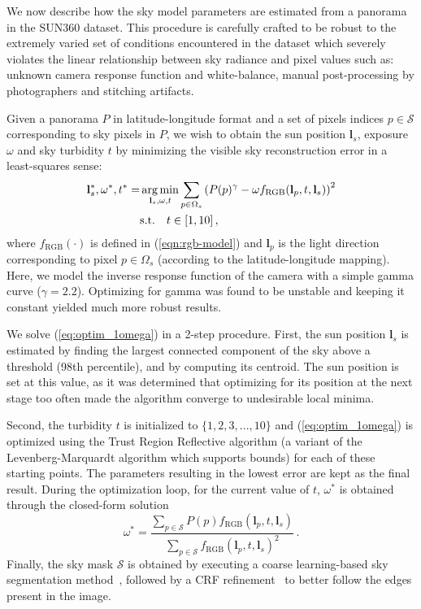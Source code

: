 We now describe how the sky model parameters are estimated from a panorama in the SUN360 dataset. This procedure is carefully crafted to be robust to the extremely varied set of conditions encountered in the dataset which severely violates the linear relationship between sky radiance and pixel values such as: unknown camera response function and white-balance, manual post-processing by photographers and stitching artifacts. 

Given a panorama $P$ in latitude-longitude format and a set of pixels indices $p \in \mathcal{S}$ corresponding to sky pixels in $P$, we wish to obtain the sun position $\mathbf{l}_s$, exposure $\omega$ and sky turbidity $t$ by minimizing the visible sky reconstruction error in a least-squares sense: 
%
\begin{equation}
\begin{split}
\mathbf{l}_s^*,\omega^*,t^* =& \operatorname*{arg\,min}_{\mathbf{l}_s,\omega,t} \sum_{p \in \Omega_s} \left(P(p)^\gamma - \omega f_\text{RGB}(\mathbf{l}_p, t, \mathbf{l}_s) \right)^2 \\
& \text{s.t.} \quad t \in [1, 10] \,, \label{eq:optim_1omega}
\end{split}
\end{equation}
%
where $f_\text{RGB}(\cdot)$ is defined in (\ref{eqn:rgb-model}) and $\mathbf{l}_p$ is the light direction corresponding to pixel $p \in \Omega_s$ (according to the latitude-longitude mapping). Here, we model the inverse response function of the camera with a simple gamma curve ($\gamma = 2.2$). Optimizing for gamma was found to be unstable and keeping it constant yielded much more robust results. 

We solve (\ref{eq:optim_1omega}) in a 2-step procedure. First, the sun position $\mathbf{l}_s$ is estimated by finding the largest connected component of the sky above a threshold (98th percentile), and by computing its centroid. The sun position is set at this value, as it was determined that optimizing for its position at the next stage too often made the algorithm converge to undesirable local minima. 

Second, the turbidity $t$ is initialized to $\{1, 2, 3, ..., 10\}$ and (\ref{eq:optim_1omega}) is optimized using the Trust Region Reflective algorithm (a variant of the Levenberg-Marquardt algorithm which supports bounds) for each of these starting points. The parameters resulting in the lowest error are kept as the final result. During the optimization loop, for the current value of $t$, $\omega^*$ is obtained through the closed-form solution
\begin{equation}
\label{eq:omega_cfs}
\omega^* = \frac{\sum_{p \in \mathcal{S}} P(p) f_\text{RGB}(\mathbf{l}_p, t, \mathbf{l}_{s})}{\sum_{p \in \mathcal{S}} f_\text{RGB}(\mathbf{l}_p, t, \mathbf{l}_s)^2} \,.
\end{equation}
%
Finally, the sky mask $\mathcal{S}$ is obtained by executing a coarse learning-based sky segmentation method~\cite{tsai-siggraph-16}, followed by a CRF refinement~\cite{krahenbuhl-nips-12} to better follow the edges present in the image.

